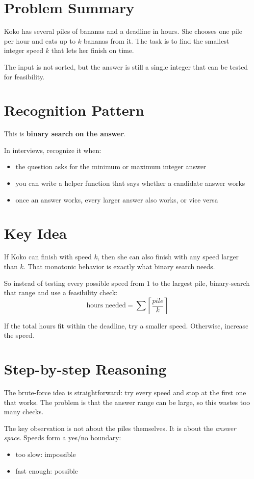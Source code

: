\section{Problem Summary}
Koko has several piles of bananas and a deadline in hours. She chooses one pile per hour and eats up to \(k\) bananas from it. The task is to find the smallest integer speed \(k\) that lets her finish on time.

The input is not sorted, but the answer is still a single integer that can be tested for feasibility.

\section{Recognition Pattern}
This is \textbf{binary search on the answer}.

In interviews, recognize it when:
\begin{itemize}
\item the question asks for the minimum or maximum integer answer
\item you can write a helper function that says whether a candidate answer works
\item once an answer works, every larger answer also works, or vice versa
\end{itemize}

\section{Key Idea}
If Koko can finish with speed \(k\), then she can also finish with any speed larger than \(k\). That monotonic behavior is exactly what binary search needs.

So instead of testing every possible speed from \(1\) to the largest pile, binary-search that range and use a feasibility check:
\[
\text{hours needed} = \sum \left\lceil \frac{pile}{k} \right\rceil
\]

If the total hours fit within the deadline, try a smaller speed. Otherwise, increase the speed.

\section{Step-by-step Reasoning}
The brute-force idea is straightforward: try every speed and stop at the first one that works. The problem is that the answer range can be large, so this wastes too many checks.

The key observation is not about the piles themselves. It is about the \emph{answer space}. Speeds form a yes/no boundary:
\begin{itemize}
\item too slow: impossible
\item fast enough: possible
\end{itemize}

